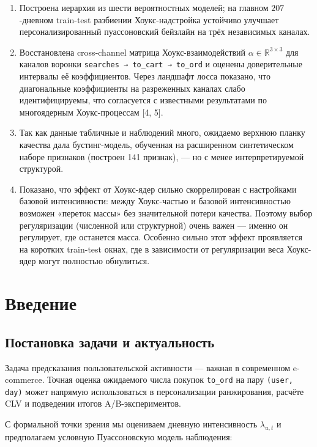 \documentclass[12pt,a4paper]{article}
\begin{document}
\begin{enumerate}
  \item Построена иерархия из шести вероятностных моделей; на главном $207$-дневном train-test разбиении Хоукс-надстройка устойчиво улучшает персонализированный пуассоновский бейзлайн на трёх независимых каналах.
  \item Восстановлена cross-channel матрица Хоукс-взаимодействий $\alpha  \in  \mathbb{R}^{3\times 3}$ для каналов воронки \texttt{searches → to\_cart → to\_ord} и оценены доверительные интервалы её коэффициентов. Через ландшафт лосса показано, что диагональные коэффициенты на разреженных каналах слабо идентифицируемы, что согласуется с известными результатами по многоядерным Хоукс-процессам [4, 5].
  \item Так как данные табличные и наблюдений много, ожидаемо верхнюю планку качества дала бустинг-модель, обученная на расширенном синтетическом наборе признаков (построен 141 признак), --- но с менее интерпретируемой структурой.
  \item Показано, что эффект от Хоукс-ядер сильно скоррелирован с настройками базовой интенсивности: между Хоукс-частью и базовой интенсивностью возможен «переток массы» без значительной потери качества. Поэтому выбор регуляризации (численной или структурной) очень важен --- именно он регулирует, где останется масса. Особенно сильно этот эффект проявляется на коротких train-test окнах, где в зависимости от регуляризации веса Хоукс-ядер могут полностью обнулиться.
\end{enumerate}

\tableofcontents
\clearpage
\section{Введение}

\FloatBarrier
\subsection{Постановка задачи и актуальность}

Задача предсказания пользовательской активности --- важная в современном e-commerce. Точная оценка ожидаемого числа покупок \texttt{to\_ord} на пару \texttt{(user, day)} может напрямую использоваться в персонализации ранжирования, расчёте CLV и подведении итогов A/B-экспериментов. 

С формальной точки зрения мы оцениваем дневную интенсивность $\lambda _{u,t}$ и предполагаем условную Пуассоновскую модель наблюдения:
\end{document}
